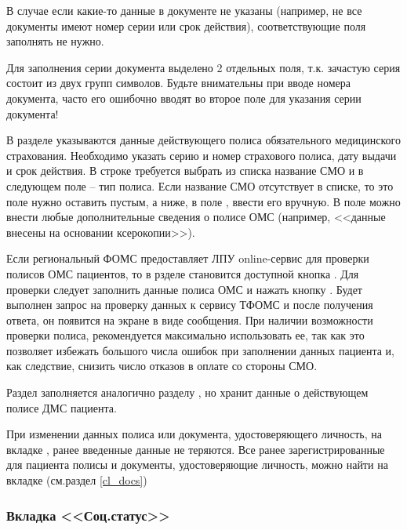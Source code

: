 В случае если какие-то данные в документе не указаны (например, не все документы имеют номер серии или срок действия), соответствующие поля заполнять не нужно.

\begin{vnim}
Для заполнения серии документа выделено 2 отдельных поля, т.к. зачастую серия состоит из двух групп символов. Будьте внимательны при вводе номера документа, часто его ошибочно вводят во второе поле для указания серии документа!
\end{vnim}
  
В разделе  указываются данные действующего полиса обязательного медицинского страхования. Необходимо указать серию и номер страхового полиса, дату выдачи и срок действия. В строке  требуется выбрать из списка название СМО и в следующем поле – тип полиса. Если название СМО отсутствует в списке, то это поле нужно оставить пустым, а ниже, в поле , ввести его вручную. В поле  можно внести любые дополнительные сведения о полисе ОМС (например, <<данные внесены на основании ксерокопии>>).

Если региональный ФОМС предоставляет ЛПУ online-сервис для проверки полисов ОМС пациентов, то в рзделе  становится доступной кнопка . Для проверки следует заполнить данные полиса ОМС и нажать кнопку . Будет выполнен запрос на проверку данных к сервису ТФОМС и после получения ответа, он появится на экране в виде сообщения. При наличии возможности проверки полиса, рекомендуется максимально использовать ее, так как это позволяет избежать большого числа ошибок при заполнении данных пациента и, как следствие, снизить число отказов в оплате со стороны СМО.

Раздел  заполняется аналогично разделу , но хранит данные о действующем полисе ДМС пациента.

\begin{prim}
При изменении данных полиса или документа, удостоверяющего личность, на вкладке , ранее введенные данные не теряются. Все ранее зарегистрированные для пациента полисы  и документы, удостоверяющие личность, можно найти на вкладке  (см.раздел \ref{cl_docs})
\end{prim}

\subsubsection{Вкладка <<Соц.статус>>} \label{cl_socst}

